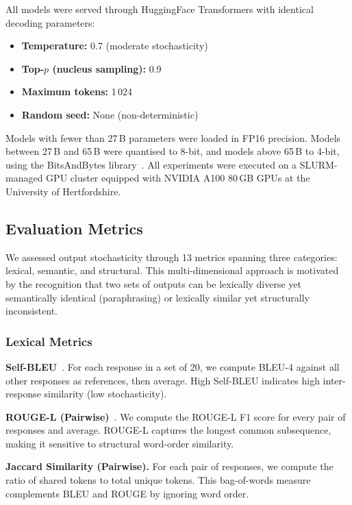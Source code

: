 \documentclass[11pt,a4paper]{article}
\begin{document}
All models were served through HuggingFace Transformers with identical decoding parameters:
\begin{itemize}[leftmargin=2em,itemsep=2pt]
    \item \textbf{Temperature:} 0.7 (moderate stochasticity)
    \item \textbf{Top-$p$ (nucleus sampling):} 0.9
    \item \textbf{Maximum tokens:} 1\,024
    \item \textbf{Random seed:} None (non-deterministic)
\end{itemize}

Models with fewer than 27\,B parameters were loaded in FP16 precision.
Models between 27\,B and 65\,B were quantised to 8-bit, and models above 65\,B to 4-bit, using the BitsAndBytes library~\citep{dettmers2023qlora}.
All experiments were executed on a SLURM-managed GPU cluster equipped with NVIDIA A100 80\,GB GPUs at the University of Hertfordshire.

\subsection{Evaluation Metrics}
\label{sec:metrics}

We assessed output stochasticity through 13 metrics spanning three categories: lexical, semantic, and structural.
This multi-dimensional approach is motivated by the recognition that two sets of outputs can be lexically diverse yet semantically identical (paraphrasing) or lexically similar yet structurally inconsistent.

\subsubsection{Lexical Metrics}

\textbf{Self-BLEU}~\citep{zhu2018texygen}.
For each response in a set of 20, we compute BLEU-4 against all other responses as references, then average.
High Self-BLEU indicates high inter-response similarity (low stochasticity).

\textbf{ROUGE-L (Pairwise)}~\citep{lin2004rouge}.
We compute the ROUGE-L F1 score for every pair of responses and average.
ROUGE-L captures the longest common subsequence, making it sensitive to structural word-order similarity.

\textbf{Jaccard Similarity (Pairwise).}
For each pair of responses, we compute the ratio of shared tokens to total unique tokens.
This bag-of-words measure complements BLEU and ROUGE by ignoring word order.
\end{document}
